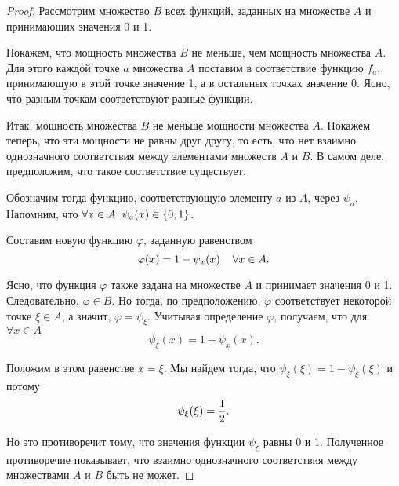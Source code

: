 \documentclass{article}
\begin{document}
\begin{proof}
Рассмотрим множество \(B\) всех функций, заданных на множестве \(A\) и принимающих значения 0 и 1.

Покажем, что мощность множества \(B\) не меньше, чем мощность множества \(A\). Для этого каждой точке \(a\) множества \(A\) поставим в соответствие функцию \(f_a\), принимающую в этой точке значение 1, а в остальных точках значение 0. Ясно, что разным точкам соответствуют разные функции.

Итак, мощность множества \(B\) не меньше мощности множества \(A\). Покажем теперь, что эти мощности не равны друг другу, то есть, что нет взаимно однозначного соответствия между элементами множеств \(A\) и \(B\). В самом деле, предположим, что такое соответствие существует.

Обозначим тогда функцию, соответствующую элементу \(a\) из \(A\), через \(\psi_a\). Напомним, что \(\forall x \in A \hspace{2mm} \psi_a(x) \in \{0, 1\}\).

Составим новую функцию \(\varphi\), заданную равенством
\[
\varphi(x) = 1 - \psi_x(x) \hspace{4mm} \forall x \in A.
\]

Ясно, что функция \(\varphi\) также задана на множестве \(A\) и принимает значения 0 и 1. Следовательно, \(\varphi \in B\). Но тогда, по предположению, \(\varphi\) соответствует некоторой точке \(\xi \in A\), а значит, \(\varphi = \psi_\xi\). Учитывая определение \(\varphi\), получаем, что для \(\forall x \in A\)
\[
\psi_\xi(x) = 1 - \psi_x(x).
\]

Положим в этом равенстве \(x = \xi\). Мы найдем тогда, что \(\psi_\xi(\xi) = 1 - \psi_\xi(\xi)\) и потому
\[
\psi_\xi(\xi) = {1 \over 2}.
\]

Но это противоречит тому, что значения функции \(\psi_\xi\) равны 0 и 1. Полученное противоречие показывает, что взаимно однозначного соответствия между множествами \(A\) и \(B\) быть не может.
\end{proof}
\end{document}

